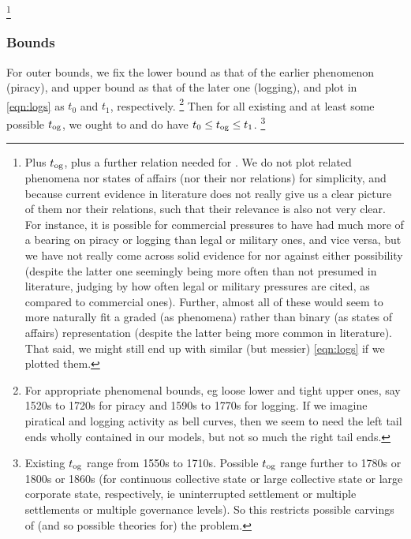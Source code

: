 		\footnote{Plus \(t_{\operatorname{og}}\), plus a further relation needed for . We do not plot related phenomena nor states of affairs (nor their  nor  relations) for simplicity, and because current evidence in literature does not really give us a clear picture of them nor their relations, such that their relevance is also not very clear. For instance, it is possible for commercial pressures to have had much more of a bearing on piracy or logging than legal or military ones, and vice versa, but we have not really come across solid evidence for nor against either possibility (despite the latter one seemingly being more often than not presumed in literature, judging by how often legal or military pressures are cited, as compared to commercial ones). Further, almost all of these would seem to more naturally fit a graded (as phenomena) rather than binary (as states of affairs) representation (despite the latter being more common in literature). That said, we might still end up with similar (but messier) \ref{eqn:logs} if we plotted them.}
		
		\subsubsection{Bounds} %
		For outer bounds, we fix the lower bound as that of the earlier phenomenon (piracy), and upper bound as that of the later one (logging), and plot in \ref{eqn:logs} as  \(t_0\) and \(t_1\), respectively.%
		\footnote{For appropriate phenomenal bounds, eg loose lower and tight upper ones, say 1520s to 1720s for piracy and 1590s to 1770s for logging. If we imagine piratical and logging activity as bell curves, then we seem to need the left tail ends wholly contained in our models, but not so much the right tail ends.}
		Then for all existing and at least some possible \(t_{\operatorname{og}}\), we ought to and do have \(t_0 \leq t_{\operatorname{og}} \leq t_1\).%
		\footnote{Existing \(t_{\operatorname{og}}\) range from 1550s to 1710s. Possible \(t_{\operatorname{og}}\) range further to 1780s or 1800s or 1860s (for continuous collective state or large collective state or large corporate state, respectively, ie uninterrupted settlement or multiple settlements or multiple governance levels). So this restricts possible carvings of (and so possible theories for) the problem.}
		
